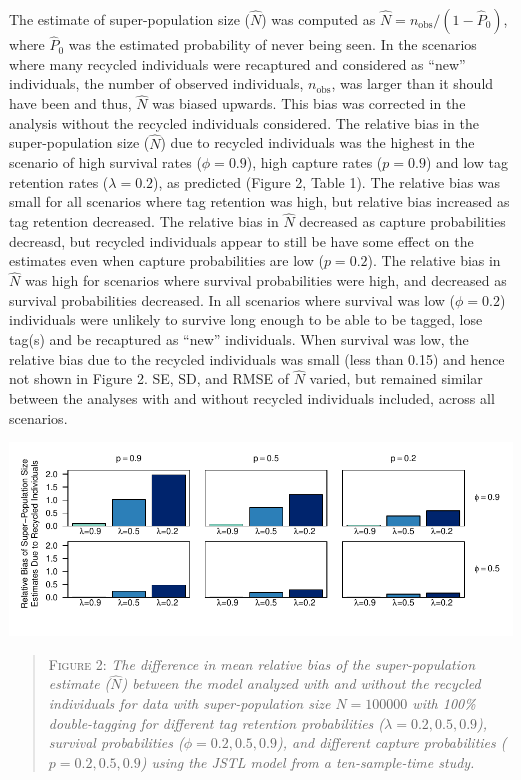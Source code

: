 \documentclass[]{article}
\begin{document}
The estimate of super-population size (\(\hat{N}\)) was computed as
\(\hat{N}=n_{\text{obs}}/{(1-\hat{P}_0)}\), where \(\hat{P}_0\) was the
estimated probability of never being seen. In the scenarios where many
recycled individuals were recaptured and considered as ``new''
individuals, the number of observed individuals, \(n_{\text{obs}}\), was larger than it should have been and thus,
\(\hat{N}\) was biased upwards. This bias was corrected in the analysis
without the recycled individuals considered. The relative bias in the
super-population size (\(\hat{N}\)) due to recycled individuals was the
highest in the scenario of high survival rates (\(\phi=0.9\)), high
capture rates (\(p=0.9\)) and low tag retention rates (\(\lambda=0.2\)),
as predicted (Figure 2, Table 1). The relative bias was small for all
scenarios where tag retention was high, but relative bias increased as
tag retention decreased. The relative bias in \(\hat{N}\) decreased as
capture probabilities decreasd, but recycled individuals appear to still
be have some effect on the estimates even when capture probabilities
are low (\(p=0.2\)). The relative bias in \(\hat{N}\) was high for
scenarios where survival probabilities were high, and decreased as
survival probabilities decreased. In all scenarios where survival was
low (\(\phi=0.2\)) individuals were unlikely to survive long enough to be
able to be tagged, lose tag(s) and be recaptured as  ``new''
individuals. When survival was low, the relative bias due to the recycled
individuals was small (less than 0.15) and hence not shown in Figure 2.
SE, SD, and RMSE of \(\hat{N}\) varied, but remained similar between the
analyses with and without recycled individuals included, across all
scenarios.

\includegraphics{RecycledPaper_files/figure-latex/Figure2_N-1.pdf}

\begin{quote}
\textsc{Figure 2:}
\textsl{The difference in mean relative bias of the super-population estimate ($\hat{N}$) between the model analyzed with and without the recycled individuals for data with super-population size $N=100 000$ with 100\% double-tagging for different tag retention probabilities ($\lambda=0.2,0.5,0.9$), survival probabilities ($\phi=0.2,0.5,0.9$), and different capture probabilities ($p=0.2,0.5,0.9$) using the JSTL model from a ten-sample-time study.}
\end{quote}
\end{document}

